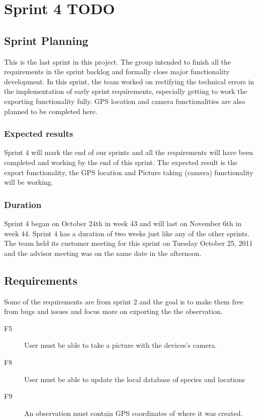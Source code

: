 \section{Sprint 4 TODO}

\subsection{Sprint Planning}

This is the last sprint in this project. The group intended to finish all the
requirements in the sprint backlog and formally close major functionality
development. In this sprint, the team worked on rectifying the technical errors
in the implementation of early sprint requirements, especially getting to work
the exporting functionality fully. GPS location and camera functionalities are
also planned to be completed here.

\subsubsection{Expected results}

Sprint 4 will mark the end of our sprints and all the requirements will have
been completed and working by the end of this sprint. The expected result is
the export functionality, the GPS location and Picture taking (camera)
functionality will be working.	

\subsubsection{Duration}

Sprint 4 began on October 24th in week 43 and will last on November 6th in week
44. Sprint 4 has a duration of two weeks just like any of the other sprints.
The team held its customer meeting for this sprint on Tuesday October 25, 2011
and the advisor meeting was on the same date in the afternoon.

\subsection{Requirements}

Some of the requirements are from sprint 2 and the goal is to make them free
from bugs and issues and focus more on exporting the the observation.

\begin{description}
	\item[F5] User must be able to take a picture with the devices's camera.
	\item[F8] User must be able to update the local database of species and locations
	\item[F9] An observation must contain GPS coordinates of where it was created.
\end{description}

